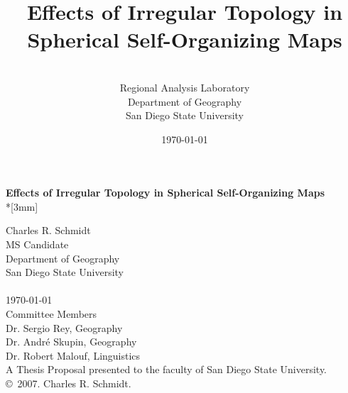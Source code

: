 \documentclass[10pt,titlepage]{article}
\title{Effects of Irregular Topology in Spherical Self-Organizing Maps}
\author{\sc{Charles R. Schmidt}\\Regional Analysis Laboratory\\Department of Geography\\San Diego State University}
\date{\today}
\begin{document}
\break
\begin{center}
{\Large{\bf Effects of Irregular Topology in Spherical Self-Organizing Maps}}\\*[3mm]
\end{center}
Charles R. Schmidt\\
MS Candidate\\
Department of Geography\\
San Diego State University\\\\
\today\\\break
Committee Members\\
Dr. Sergio Rey, Geography\\
Dr. Andr{\'e} Skupin, Geography\\
Dr. Robert Malouf, Linguistics\\\break
A Thesis Proposal presented to the faculty of San Diego State University.\\
\copyright~2007. Charles R. Schmidt. \\
%
\\
\tableofcontents
\newpage


%
\end{document}
